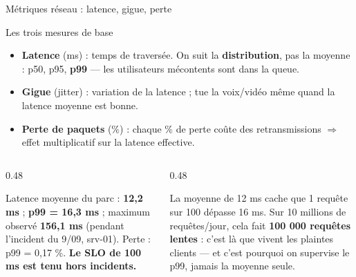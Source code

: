 \begin{frame}{Métriques réseau : latence, gigue, perte}
\begin{block}{Les trois mesures de base}
\begin{itemize}
\item \textbf{Latence} (ms) : temps de traversée. On suit la \textbf{distribution},
pas la moyenne : p50, p95, \textbf{p99} --- les utilisateurs mécontents sont dans la queue.
\item \textbf{Gigue} (jitter) : variation de la latence ; tue la voix/vidéo même
quand la latence moyenne est bonne.
\item \textbf{Perte de paquets} (\%) : chaque \% de perte coûte des retransmissions
$\Rightarrow$ effet multiplicatif sur la latence effective.
\end{itemize}
\end{block}
\begin{columns}[t]
\begin{column}{0.48\textwidth}
\begin{ebox}
Latence moyenne du parc : \textbf{12,2 ms} ;
\textbf{p99 = 16,3 ms} ; maximum observé \textbf{156,1 ms}
(pendant l'incident du 9/09, srv-01).
Perte : p99 = 0,17 \%. \textbf{Le SLO de 100 ms est tenu hors incidents.}
\end{ebox}
\end{column}
\begin{column}{0.48\textwidth}
\begin{kbox}
La moyenne de 12 ms cache que 1 requête sur 100 dépasse 16 ms.
Sur 10 millions de requêtes/jour, cela fait \textbf{100 000 requêtes lentes} :
c'est là que vivent les plaintes clients --- et c'est pourquoi on supervise
le p99, jamais la moyenne seule.
\end{kbox}
\end{column}
\end{columns}
\end{frame}

